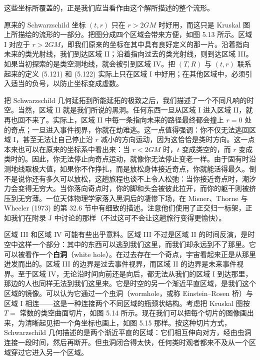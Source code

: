 这些坐标所覆盖的，正是我们应当看作由这个解所描述的整个流形。

原来的 Schwarzschild 坐标 $(t, r)$ 只在 $r > 2GM$ 时好用，而这只是 Kruskal 图上所描绘的流形的一部分。把图分成四个区域会带来方便，如图 5.13 所示。区域 I 对应于 $r > 2GM$，即我们原来的坐标在其中具有良好定义的那一片。沿着指向未来的类光射线，我们到达区域 II；沿着指向过去的类光射线，则到达区域 III。如果当初探索的是类空测地线，就会被引到区域 IV。把 $(T, R)$ 与 $(t, r)$ 联系起来的定义 (5.121) 和 (5.122) 实际上只在区域 I 中好用；在其他区域中，必须引入适当的负号，以防止坐标变成虚数。


把 Schwarzschild 几何延拓到所能延拓的极致之后，我们描述了一个不同凡响的时空。当然，区域 II 就是我们所说的黑洞。任何东西一旦从区域 I 进入区域 II，就再也回不来了。实际上，区域 II 中每一条指向未来的路径最终都会撞上 $r = 0$ 处的奇点；一旦进入事件视界，你就在劫难逃。这一点值得强调：你不仅无法逃回区域 I，甚至无法让自己停止沿 $r$ 减小的方向运动，因为这恰恰是类时方向。这一点本来也可以在原来的坐标系中看出来：当 $r < 2GM$ 时，$t$ 变成类空的，而 $r$ 变成类时的。因此，你无法停止向奇点运动，就像你无法停止变老一样。由于固有时沿测地线取极大值，如果你不作挣扎，而是放松身体接近奇点，你就能活得最久。倒不是说你还有多久可以放松，这趟旅程也谈不上令人松弛：当你接近奇点时，潮汐力会变得无穷大。当你落向奇点时，你的脚和头会被彼此拉开，而你的躯干则被挤压到无穷薄。一位天体物理学家落入黑洞后的凄惨下场，在 Misner、Thorne 与 Wheeler (1973) 的第 32.6 节中有细致的描述。注意他们使用了正交归一标架，正如我们在附录 J 中讨论的那样（不过这可不会让这趟旅行变得更愉快）。

区域 III 和区域 IV 可能有些出乎意料。区域 III 不过是区域 II 的时间反演，是时空中这样一个部分：其中的东西可以逃到我们这里，而我们却永远到不了那里。它可以被看作一个\textbf{白洞}（white hole）。在过去存在一个奇点，宇宙看起来正是从那里迸发而出的。区域 III 的边界是过去事件视界，而区域 II 的边界是未来事件视界。至于区域 IV，无论沿时间向前还是向后，都无法从我们的区域 I 到达那里，那边的人也同样无法到我们这里来。它是时空的另一个渐近平直区域，是我们这个区域的镜像。可以认为它通过一个虫洞（wormhole，或称 Einstein--Rosen 桥）与区域 I 相连——这是一种连接两个不同区域的瓶颈状结构。考虑把 Kruskal 图按 $T =$ 常数的类空曲面切片，如图 5.14 所示。现在我们可以把每个切片的图像画出来，为清晰起见把一个角坐标也画上，如图 5.15 那样。按这种切片方式，Schwarzschild 几何描述的是两个渐近平直的区域：它们相互伸向对方，经由虫洞连接一段时间，然后再断开。但虫洞闭合得太快，任何类时观者都来不及从一个区域穿过它进入另一个区域。

